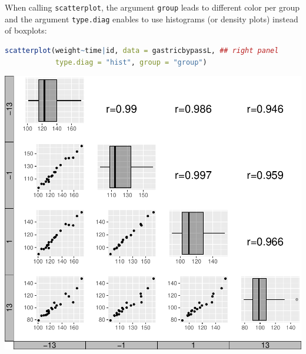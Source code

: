 \documentclass[12pt]{article}
\begin{document}
When calling \texttt{scatterplot}, the argument \texttt{group} leads to different
color per group and the argument \texttt{type.diag} enables to use histograms
(or density plots) instead of boxplots:
\begin{lstlisting}[language=r,numbers=none]
scatterplot(weight~time|id, data = gastricbypassL, ## right panel
            type.diag = "hist", group = "group")
\end{lstlisting}


\bigskip

\begin{minipage}{0.48\linewidth}
\begin{center}
\includegraphics[trim={0 0 0 0},width=\textwidth]{./figures/scatterplot.pdf}
\end{center}
\end{minipage}
\end{document}
